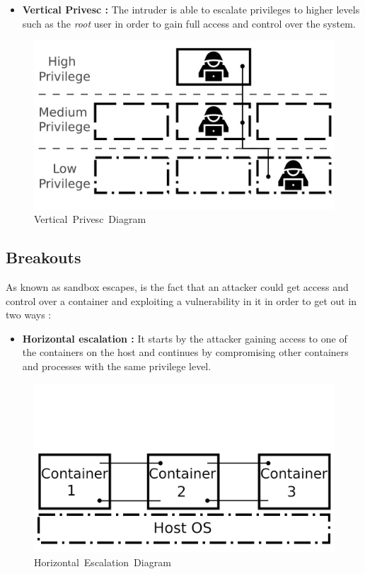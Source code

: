 \documentclass[
  14pt,
  english,
  a4paper,
]{scrreprt}
\providecommand{\tightlist}{%
  \setlength{\itemsep}{0pt}\setlength{\parskip}{0pt}}
\begin{document}
\begin{itemize}
\tightlist
\item
  \textbf{Vertical Privesc :} The intruder is able to escalate
  privileges to higher levels such as the \emph{root} user in order to
  gain full access and control over the system.
\end{itemize}

\begin{figure}
\hypertarget{fig:vpresc}{%
\centering
\includegraphics[width=1\textwidth,height=\textheight]{figures/vert_presc_diagram.png}
\caption{Vertical~Privesc~Diagram}\label{fig:vpresc}
}
\end{figure}

\hypertarget{breakouts}{%
\subsection{Breakouts}\label{breakouts}}

As known as sandbox escapes, is the fact that an attacker could get
access and control over a container and exploiting a vulnerability in it
in order to get out in two ways :

\begin{itemize}
\tightlist
\item
  \textbf{Horizontal escalation :} It starts by the attacker gaining
  access to one of the containers on the host and continues by
  compromising other containers and processes with the same privilege
  level.
\end{itemize}

\begin{figure}
\hypertarget{fig:horesc}{%
\centering
\includegraphics[width=1\textwidth,height=\textheight]{figures/horiz_esc_diagram.png}
\caption{Horizontal~Escalation~Diagram}\label{fig:horesc}
}
\end{figure}
\end{document}

